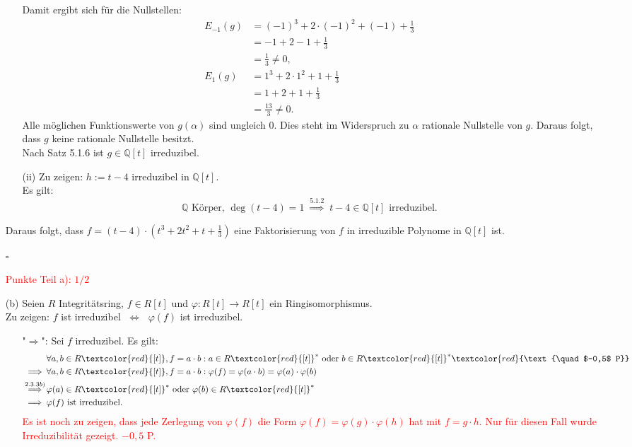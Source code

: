 \documentclass[12pt]{article}
\newcommand{\corr}[1]{\textcolor{red}{#1}}
\newcommand{\QED}{\begin{flushright} $\square$ \end{flushright}}
\newcommand{\df}{\enspace\Longrightarrow\enspace}
\newcommand{\gdw}{\;\Longleftrightarrow\;}
\newcommand{\grad}{\operatorname{deg}}
\begin{document}
\begin{enumerate}
\begin{enumerate}
		Damit ergibt sich für die Nullstellen:
		\begin{align*}
			E_{-1}(g)&=(-1)^3+2\cdot(-1)^2+(-1)+\frac{1}{3} \\
			&=-1+2-1+\frac{1}{3} \\
			&=\frac{1}{3}\neq0, \\
			E_{1}(g)&=1^3+2\cdot1^2+1+\frac{1}{3} \\
			&=1+2+1+\frac{1}{3} \\
			&=\frac{13}{3}\neq0.
		\end{align*}
		Alle möglichen Funktionswerte von $g(\alpha)$ sind ungleich $0$. Dies steht im Widerspruch zu $\alpha$ rationale Nullstelle von $g$. Daraus folgt, dass $g$ keine rationale Nullstelle besitzt. \\
		Nach Satz 5.1.6 ist $g\in\mathbb{Q}[t]$ irreduzibel.
		
		\item[(ii)] Zu zeigen: $h:=t-4$ irreduzibel in $\mathbb{Q}[t]$. \\
		Es gilt: $$\mathbb{Q}\text{ Körper, }\grad(t-4)=1\overset{5.1.2}{\df}t-4\in\mathbb{Q}[t]\text{ irreduzibel}.$$
	\end{enumerate}
	Daraus folgt, dass $f=\left(t-4\right)\cdot\left(t^3+2t^2+t+\frac{1}{3}\right)$ eine Faktorisierung von $f$ in irreduzible Polynome in $\mathbb{Q}[t]$ ist.
	\QED
\corr{Punkte Teil a): $1/2$}	

	\item[(b)] Seien $R$ Integritätsring, $f\in R[t]$ und $\varphi:R[t]\rightarrow R[t]$ ein Ringisomorphismus. \\
	Zu zeigen: $f$ ist irreduzibel $\gdw$ $\varphi(f)$ ist irreduzibel. \\
	\begin{enumerate}
		\item["$\Longrightarrow$":] Sei $f$ irreduzibel. Es gilt:
		\begin{align*}
			&\forall a,b\in R\corr{[t]},f=a\cdot b:a\in R\corr{[t]}^*\text{ oder }b\in R\corr{[t]}^* \corr{\text{\quad $-0,5$ P}} \\
			\df&\forall a,b\in R\corr{[t]},f=a\cdot b:\varphi(f)=\varphi(a\cdot b)=\varphi(a)\cdot\varphi(b) \\
			\overset{2.3.3b)}{\df}&\varphi(a)\in R\corr{[t]}^*\text{ oder }\varphi(b)\in R\corr{[t]}^* \\
			\df&\varphi(f)\text{ ist irreduzibel}.
		\end{align*}
\corr{Es ist noch zu zeigen, dass jede Zerlegung von $\varphi(f)$ die Form $\varphi(f)= \varphi(g)\cdot \varphi(h)$ hat mit $f=g \cdot h$. Nur für diesen Fall wurde Irreduzibilität gezeigt. $-0,5$ P.}
		

\end{enumerate}
\end{enumerate}
\end{document}
